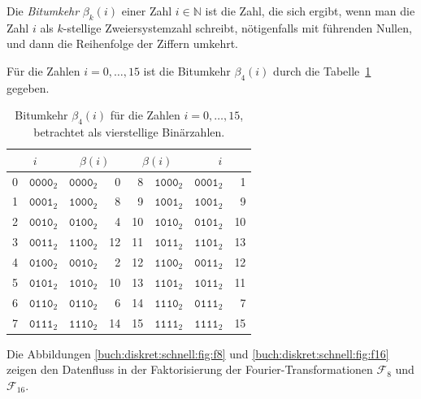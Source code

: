 \begin{definition}
Die {\em Bitumkehr} $\beta_k(i)$ einer Zahl $i\in\mathbb{N}$ ist
die Zahl, die sich ergibt, wenn man die Zahl $i$ als $k$-stellige
Zweiersystemzahl schreibt, nötigenfalls mit führenden Nullen,  und
dann die Reihenfolge der Ziffern umkehrt.
\end{definition}

\begin{beispiel}
Für die Zahlen $i=0,\dots,15$  ist die Bitumkehr $\beta_4(i)$ durch
die Tabelle~\ref{buch:diskret:schnell:table:bitumkehr} gegeben.
\end{beispiel}

\begin{table}
\centering
\begin{tabular}{|r|r|r|r||r|r|r|r|}
\hline
\multicolumn{2}{|c|}{$i$}&
\multicolumn{2}{|c||}{$\beta(i)$}&
\multicolumn{2}{|c|}{$\beta(i)$}&
\multicolumn{2}{|c|}{$i$}
\\
\hline
0&$\texttt{0000}_2$&$\texttt{0000}_2$& 0& 8&$\texttt{1000}_2$&$\texttt{0001}_2$& 1\\
1&$\texttt{0001}_2$&$\texttt{1000}_2$& 8& 9&$\texttt{1001}_2$&$\texttt{1001}_2$& 9\\
2&$\texttt{0010}_2$&$\texttt{0100}_2$& 4&10&$\texttt{1010}_2$&$\texttt{0101}_2$&10\\
3&$\texttt{0011}_2$&$\texttt{1100}_2$&12&11&$\texttt{1011}_2$&$\texttt{1101}_2$&13\\
4&$\texttt{0100}_2$&$\texttt{0010}_2$& 2&12&$\texttt{1100}_2$&$\texttt{0011}_2$&12\\
5&$\texttt{0101}_2$&$\texttt{1010}_2$&10&13&$\texttt{1101}_2$&$\texttt{1011}_2$&11\\
6&$\texttt{0110}_2$&$\texttt{0110}_2$& 6&14&$\texttt{1110}_2$&$\texttt{0111}_2$& 7\\
7&$\texttt{0111}_2$&$\texttt{1110}_2$&14&15&$\texttt{1111}_2$&$\texttt{1111}_2$&15\\
\hline
\end{tabular}
\caption{Bitumkehr $\beta_4(i)$ für die Zahlen $i=0,\dots,15$, betrachtet
als vierstellige Binärzahlen.
\label{buch:diskret:schnell:table:bitumkehr}}
\end{table}

Die Abbildungen 
\ref{buch:diskret:schnell:fig:f8}
und
\ref{buch:diskret:schnell:fig:f16}
zeigen den Datenfluss in der Faktorisierung der Fourier-Transformationen
$\mathscr{F}_8$ und $\mathscr{F}_{16}$.


